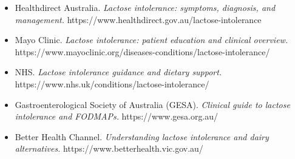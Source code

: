 \begin{itemize}
    \item Healthdirect Australia. \textit{Lactose intolerance: symptoms, diagnosis, and management.} https://www.healthdirect.gov.au/lactose-intolerance
    \item Mayo Clinic. \textit{Lactose intolerance: patient education and clinical overview.} https://www.mayoclinic.org/diseases-conditions/lactose-intolerance/
    \item NHS. \textit{Lactose intolerance guidance and dietary support.} https://www.nhs.uk/conditions/lactose-intolerance/
    \item Gastroenterological Society of Australia (GESA). \textit{Clinical guide to lactose intolerance and FODMAPs.} https://www.gesa.org.au/
    \item Better Health Channel. \textit{Understanding lactose intolerance and dairy alternatives.} https://www.betterhealth.vic.gov.au/
\end{itemize}
